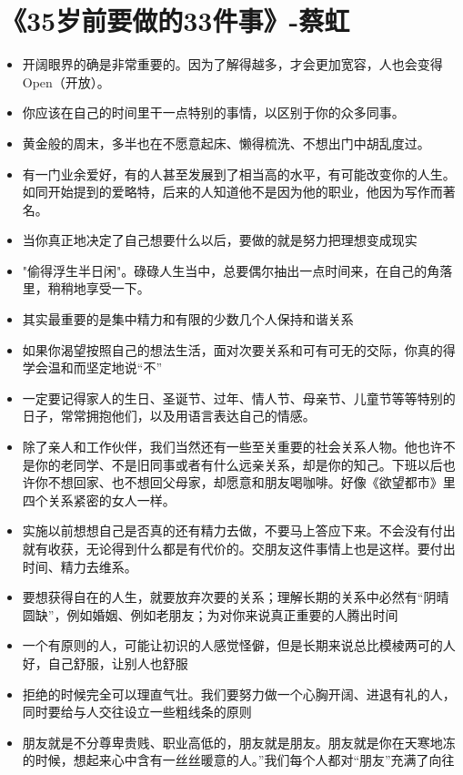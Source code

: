 \documentclass[UTF8,a4paper,8pt]{ctexart}
\begin{document}
 \newpage
 \section{《35岁前要做的33件事》-蔡虹 }
 \begin{itemize}
 	\item 开阔眼界的确是非常重要的。因为了解得越多，才会更加宽容，人也会变得Open（开放）。
 	\item 你应该在自己的时间里干一点特别的事情，以区别于你的众多同事。
 	\item 黄金般的周末，多半也在不愿意起床、懒得梳洗、不想出门中胡乱度过。
 	\item 有一门业余爱好，有的人甚至发展到了相当高的水平，有可能改变你的人生。如同开始提到的爱略特，后来的人知道他不是因为他的职业，他因为写作而著名。
 	\item 当你真正地决定了自己想要什么以后，要做的就是努力把理想变成现实
 	\item "偷得浮生半日闲"。碌碌人生当中，总要偶尔抽出一点时间来，在自己的角落里，稍稍地享受一下。
 	\item 其实最重要的是集中精力和有限的少数几个人保持和谐关系
 	\item 如果你渴望按照自己的想法生活，面对次要关系和可有可无的交际，你真的得学会温和而坚定地说“不”
 	\item 一定要记得家人的生日、圣诞节、过年、情人节、母亲节、儿童节等等特别的日子，常常拥抱他们，以及用语言表达自己的情感。
 	\item 除了亲人和工作伙伴，我们当然还有一些至关重要的社会关系人物。他也许不是你的老同学、不是旧同事或者有什么远亲关系，却是你的知己。下班以后也许你不想回家、也不想回父母家，却愿意和朋友喝咖啡。好像《欲望都市》里四个关系紧密的女人一样。
 	\item 实施以前想想自己是否真的还有精力去做，不要马上答应下来。不会没有付出就有收获，无论得到什么都是有代价的。交朋友这件事情上也是这样。要付出时间、精力去维系。
 	\item 要想获得自在的人生，就要放弃次要的关系；理解长期的关系中必然有“阴晴圆缺”，例如婚姻、例如老朋友；为对你来说真正重要的人腾出时间
 	\item 一个有原则的人，可能让初识的人感觉怪僻，但是长期来说总比模棱两可的人好，自己舒服，让别人也舒服
 	\item 拒绝的时候完全可以理直气壮。我们要努力做一个心胸开阔、进退有礼的人，同时要给与人交往设立一些粗线条的原则
 	\item 朋友就是不分尊卑贵贱、职业高低的，朋友就是朋友。朋友就是你在天寒地冻的时候，想起来心中含有一丝丝暖意的人。”我们每个人都对“朋友”充满了向往
 \end{itemize}
 
\end{document}
